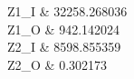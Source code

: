 Z1_I	&	32258.268036\\\hline
Z1_O	&	942.142024\\\hline
Z2_I	&	8598.855359\\\hline
Z2_O	&	0.302173\\\hline
